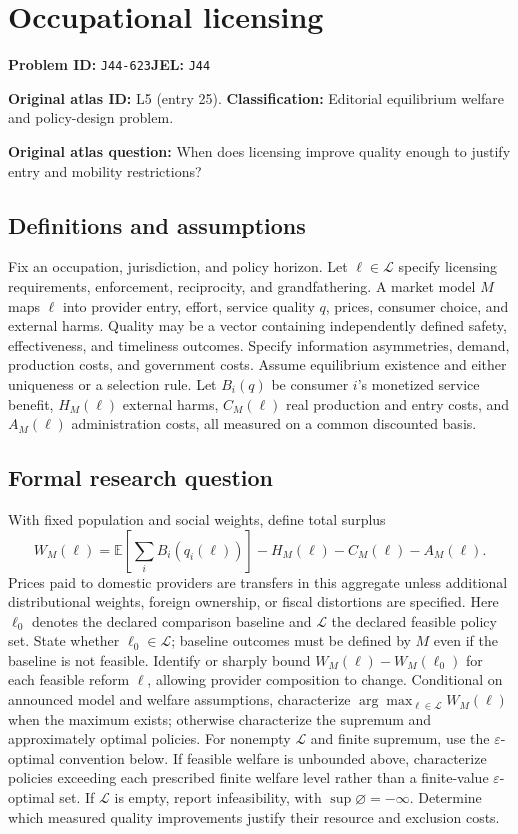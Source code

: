 \documentclass[11pt,a4paper]{article}
\begin{document}
\section*{Occupational licensing}
\textbf{Problem ID:} \texttt{J44-623}\quad \textbf{JEL:} \texttt{J44}\par
\label{problem:OP-0025}
\label{atlas:prob:L5}
\noindent\textbf{Original atlas ID:} L5 (entry 25). \textbf{Classification:} Editorial equilibrium welfare and policy-design problem.

\noindent\textbf{Original atlas question:} When does licensing improve quality enough to justify entry and mobility restrictions?

\subsection*{Definitions and assumptions}
Fix an occupation, jurisdiction, and policy horizon. Let $\ell\in\mathcal L$ specify licensing requirements, enforcement, reciprocity, and grandfathering. A market model $M$ maps $\ell$ into provider entry, effort, service quality $q$, prices, consumer choice, and external harms. Quality may be a vector containing independently defined safety, effectiveness, and timeliness outcomes. Specify information asymmetries, demand, production costs, and government costs. Assume equilibrium existence and either uniqueness or a selection rule. Let $B_i(q)$ be consumer $i$'s monetized service benefit, $H_M(\ell)$ external harms, $C_M(\ell)$ real production and entry costs, and $A_M(\ell)$ administration costs, all measured on a common discounted basis.
\subsection*{Formal research question}
With fixed population and social weights, define total surplus
\[
 W_M(\ell)=\mathbb E\left[\sum_i B_i(q_i(\ell))\right]
             -H_M(\ell)-C_M(\ell)-A_M(\ell).
\]
Prices paid to domestic providers are transfers in this aggregate unless additional distributional weights, foreign ownership, or fiscal distortions are specified. Here $\ell_0$ denotes the declared comparison baseline and $\mathcal L$ the declared feasible policy set. State whether $\ell_0\in\mathcal L$; baseline outcomes must be defined by $M$ even if the baseline is not feasible. Identify or sharply bound $W_M(\ell)-W_M(\ell_0)$ for each feasible reform $\ell$, allowing provider composition to change. Conditional on announced model and welfare assumptions, characterize $\arg\max_{\ell\in\mathcal L}W_M(\ell)$ when the maximum exists; otherwise characterize the supremum and approximately optimal policies. For nonempty $\mathcal L$ and finite supremum, use the $\varepsilon$-optimal convention below. If feasible welfare is unbounded above, characterize policies exceeding each prescribed finite welfare level rather than a finite-value $\varepsilon$-optimal set. If $\mathcal L$ is empty, report infeasibility, with $\sup\varnothing=-\infty$. Determine which measured quality improvements justify their resource and exclusion costs.
\end{document}
